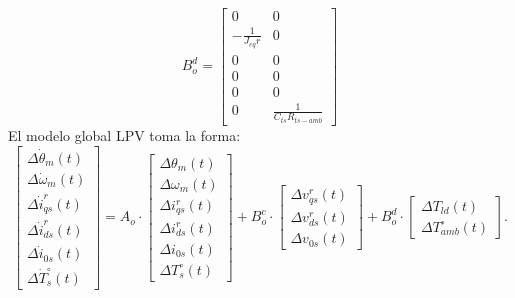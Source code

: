 \documentclass[12pt, a4paper,journal, onecolumn, compsoc]{IEEEtran}
\begin{document}
\begin{equation*}
B_o^d = \begin{bmatrix}
0 & 0 \\
-\frac{1}{J_{eq} r} & 0 \\
0 & 0 \\
0 & 0 \\
0 & 0 \\
0 & \frac{1}{C_{ts} R_{ts-amb}}
\end{bmatrix} 
\end{equation*}
El modelo global LPV toma la forma:
\begin{equation}
\begin{bmatrix}
\Delta \dot{\theta}_m(t) \\
\Delta \dot{\omega}_m(t) \\
\Delta \dot{i}_{qs}^r(t) \\
\Delta \dot{i}_{ds}^r(t) \\
\Delta \dot{i}_{0s}(t) \\
\Delta \dot{T}_s^\circ(t)
\end{bmatrix} = A_o \cdot 
\begin{bmatrix}
\Delta \theta_m(t) \\
\Delta \omega_m(t) \\
\Delta i_{qs}^r(t) \\
\Delta i_{ds}^r(t) \\
\Delta i_{0s}(t) \\
\Delta T_s^\circ(t)
\end{bmatrix} + B_o^c \cdot 
\begin{bmatrix}
\Delta v_{qs}^r(t) \\
\Delta v_{ds}^r(t) \\
\Delta v_{0s}(t)
\end{bmatrix} + B_o^d \cdot 
\begin{bmatrix}
\Delta T_{ld}(t) \\
\Delta T_{amb}^\circ(t)
\end{bmatrix}.
\end{equation}
\end{document}
